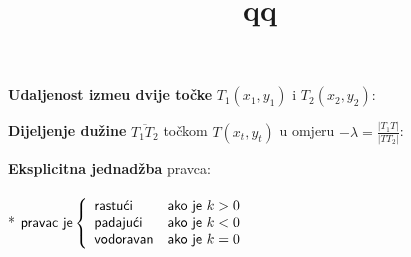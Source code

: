 \documentclass[9pt,oneside,a4paper]{report}
\title{qq}
\begin{document}
\begin{center}
\end{center}

\begin{floatingfigure}[r]{7cm}
\end{floatingfigure}

\vspace{3mm}
\noindent \textbf{Udaljenost izme\dj{}u dvije to\v{c}ke} $T_1(x_1,y_1)$ i $T_2(x_2,y_2)$:\\
\hspace*{10mm}

\vspace{3mm}
\noindent \textbf{Dijeljenje du\v{z}ine} $\overline{T_1T_2}$ to\v{c}kom
$T(x_t,y_t)$ u omjeru $-\lambda =\frac{|T_1T|}{|TT_2|}$:
\hspace{5mm}
\hspace{5mm}

\vspace{9mm}
\noindent
{}

\vspace{3mm}
\begin{floatingfigure}[r]{5cm}
\vspace*{1cm}
\end{floatingfigure}

\noindent \textbf{Eksplicitna jednad\v{z}ba} pravca:\hspace{5mm} 
\\
\\*
\hspace*{5mm}$\displaystyle \textrm{\textsf{pravac je}}\left\{
\begin{array}{ll}
\textrm{\textsf{rastu\'{c}i}} & \textrm{\textsf{ako je $k>0$}}\\
\textrm{\textsf{padaju\'{c}i}} & \textrm{\textsf{ako je $k<0$}}\\
\textrm{\textsf{vodoravan}} & \textrm{\textsf{ako je $k=0$}}\\
\end{array} \right.$
\end{document}
